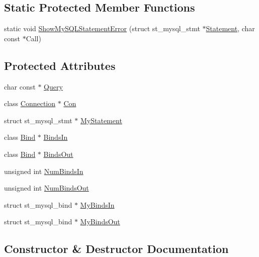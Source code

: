 \subsection*{Static Protected Member Functions}
\begin{DoxyCompactItemize}
\item 
static void \hyperlink{class_statement_aa129d8ee24ae51acadb39d5ab630649d}{Show\+My\+S\+Q\+L\+Statement\+Error} (struct st\+\_\+mysql\+\_\+stmt $\ast$\hyperlink{class_statement}{Statement}, char const $\ast$Call)
\end{DoxyCompactItemize}
\subsection*{Protected Attributes}
\begin{DoxyCompactItemize}
\item 
char const $\ast$ \hyperlink{class_statement_a88a32c1c42ef234f2b417d05375d2a3d}{Query}
\item 
class \hyperlink{class_connection}{Connection} $\ast$ \hyperlink{class_statement_a6d0ec1140215c6d723155ec16e0c4227}{Con}
\item 
struct st\+\_\+mysql\+\_\+stmt $\ast$ \hyperlink{class_statement_a8f0cd2a9619ceaee6cd157ce879b2f11}{My\+Statement}
\item 
class \hyperlink{class_bind}{Bind} $\ast$ \hyperlink{class_statement_a2909234df7aef1d8106e56ffd4173348}{Binds\+In}
\item 
class \hyperlink{class_bind}{Bind} $\ast$ \hyperlink{class_statement_ab7945c474d620d606aa5a1fe42d67e69}{Binds\+Out}
\item 
unsigned int \hyperlink{class_statement_a596ea0debeeabfb4ee905dc75c0bcbe5}{Num\+Binds\+In}
\item 
unsigned int \hyperlink{class_statement_a5550223a6881e42d00973968fbdf2b9d}{Num\+Binds\+Out}
\item 
struct st\+\_\+mysql\+\_\+bind $\ast$ \hyperlink{class_statement_aba9c9b66e160d22b83499dffbe553ab4}{My\+Binds\+In}
\item 
struct st\+\_\+mysql\+\_\+bind $\ast$ \hyperlink{class_statement_ab9e7e021c560025ec51bc8b7570e6f99}{My\+Binds\+Out}
\end{DoxyCompactItemize}


\subsection{Constructor \& Destructor Documentation}
\hypertarget{class_statement_ab48acf95bec5dea254f44390c6221eb1}{}
